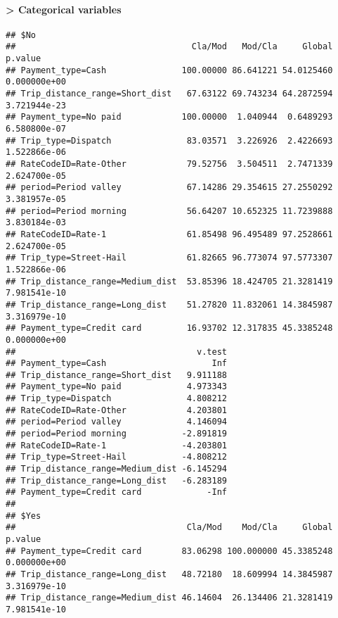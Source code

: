 \documentclass[
  18pt,
  a4paper]{article}
\newenvironment{Shaded}{\begin{snugshade}}{\end{snugshade}}
\newcommand{\NormalTok}[1]{#1}
\newcommand{\OperatorTok}[1]{\textcolor[rgb]{0.81,0.36,0.00}{\textbf{#1}}}
\begin{document}
\hypertarget{categorical-variables-1}{%
\paragraph{\textgreater{} Categorical
variables}\label{categorical-variables-1}}

\begin{Shaded}
\end{Shaded}

\begin{verbatim}
## $No
##                                   Cla/Mod   Mod/Cla     Global      p.value
## Payment_type=Cash               100.00000 86.641221 54.0125460 0.000000e+00
## Trip_distance_range=Short_dist   67.63122 69.743234 64.2872594 3.721944e-23
## Payment_type=No paid            100.00000  1.040944  0.6489293 6.580800e-07
## Trip_type=Dispatch               83.03571  3.226926  2.4226693 1.522866e-06
## RateCodeID=Rate-Other            79.52756  3.504511  2.7471339 2.624700e-05
## period=Period valley             67.14286 29.354615 27.2550292 3.381957e-05
## period=Period morning            56.64207 10.652325 11.7239888 3.830184e-03
## RateCodeID=Rate-1                61.85498 96.495489 97.2528661 2.624700e-05
## Trip_type=Street-Hail            61.82665 96.773074 97.5773307 1.522866e-06
## Trip_distance_range=Medium_dist  53.85396 18.424705 21.3281419 7.981541e-10
## Trip_distance_range=Long_dist    51.27820 11.832061 14.3845987 3.316979e-10
## Payment_type=Credit card         16.93702 12.317835 45.3385248 0.000000e+00
##                                    v.test
## Payment_type=Cash                     Inf
## Trip_distance_range=Short_dist   9.911188
## Payment_type=No paid             4.973343
## Trip_type=Dispatch               4.808212
## RateCodeID=Rate-Other            4.203801
## period=Period valley             4.146094
## period=Period morning           -2.891819
## RateCodeID=Rate-1               -4.203801
## Trip_type=Street-Hail           -4.808212
## Trip_distance_range=Medium_dist -6.145294
## Trip_distance_range=Long_dist   -6.283189
## Payment_type=Credit card             -Inf
## 
## $Yes
##                                  Cla/Mod    Mod/Cla     Global      p.value
## Payment_type=Credit card        83.06298 100.000000 45.3385248 0.000000e+00
## Trip_distance_range=Long_dist   48.72180  18.609994 14.3845987 3.316979e-10
## Trip_distance_range=Medium_dist 46.14604  26.134406 21.3281419 7.981541e-10

\end{verbatim}
\end{document}
